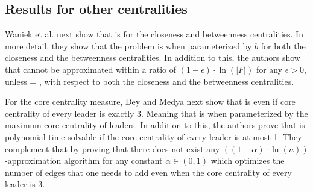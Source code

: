\subsection{Results for other centralities}

Waniek et al. next show that \HL is \NPc for the closeness \cite{Waniek2017} and betweenness \cite{Waniek2021full} centralities.
In more detail, they show that the problem is \Wh when parameterized by $b$ for both the closeness and the betweenness centralities.
In addition to this, the authors show that \HL cannot be approximated within a ratio of $(1 - \epsilon ) \cdot \ln(|F|)$
for any $\epsilon > 0$, unless \Po = \NP, with respect to both the closeness and the betweenness centralities.

For the core centrality measure, Dey and Medya \cite{Dey2019} next show that \HLshort is \NPc even if core centrality of
every leader is exactly 3. Meaning that \HLshort is \pNPh when parameterized by the maximum core centrality of leaders.
In addition to this, the authors prove that \HLshort is polynomial time solvable
if the core centrality of every leader is at most 1.
They complement that by proving that there does not exist any $((1 - \alpha) \cdot \ln(n))$-approximation algorithm
for any constant $\alpha \in (0, 1)$ which optimizes the number of edges that one needs to add even
when the core centrality of every leader is 3.
 
